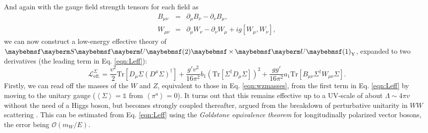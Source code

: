 And again with the gauge field strength tensors for each field as
\begin{eqnarray}
B_{\mu \nu} &=& \partial_{\mu} B_{\nu} - \partial_{\nu} B_{\mu}, \\
W_{\mu \nu} &=& \partial_{\mu} W_{\nu} - \partial_{\nu} W_{\mu} + ig [W_{\mu},W_{\nu}],
\end{eqnarray}
we can now construct a low-energy effective theory of $\SUgroup{2} \times \Ugroup{1}_{\text{Y}}$, expanded to two derivatives (the leading term in Eq. \ref{eqn:Leff}):
\begin{equation}
\mathcal{L}^{\Sigma}_{\text{eff.}} = \frac{v^2}{2} \text{Tr}[D_{\mu} \Sigma (D^{\mu} \Sigma)^{\dagger}] +\frac{g'v^2}{16 \pi^2} b_1 \left( \text{Tr}[\Sigma^{\dagger} D_{\mu} \Sigma]\right)^2 + \frac{g g'}{16 \pi^2} a_1 \text{Tr} [B_{\mu \nu} \Sigma^{\dagger} W_{\mu \nu} \Sigma ].
\label{eqn:Leff}
\end{equation}
Firstly, we can read off the masses of the $W$ and $Z$, equivalent to those in Eq. \ref{eqn:wzmasses}, from the first term in Eq. \ref{eqn:Leff} by moving to the unitary gauge ($\left\langle \Sigma \right\rangle = \mathbb{1}$ from $\left\langle \pi^a \right\rangle = 0$). It turns out that this remains effective up to a UV-scale of about $\Lambda \sim 4\pi v$ without the need of a Higgs boson, but becomes strongly coupled thereafter, argued from the breakdown of perturbative unitarity in $WW$ scattering \cite{RN658, RN660,RN659}. This can be estimated from Eq. \ref{eqn:Leff} using the \textit{Goldstone equivalence theorem} \cite{RN662,RN661,RN663,RN664} for longitudinally polarized vector bosons, the error being $\mathcal{O}(m_W/E)$.


